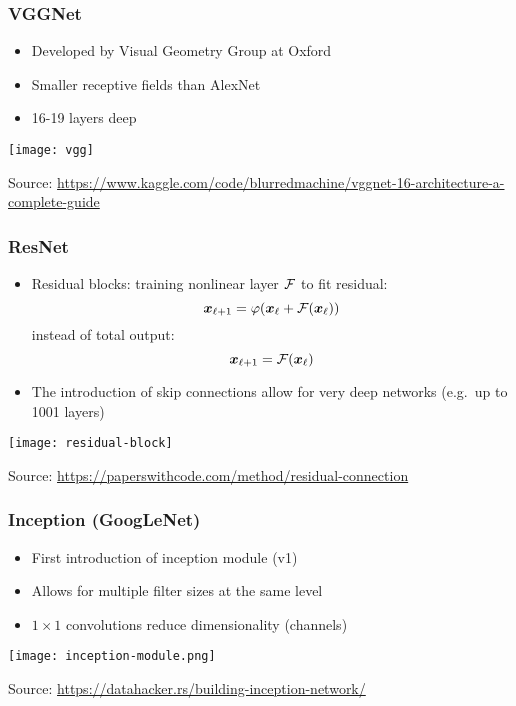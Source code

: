 \documentclass[smaller]{beamer}
\begin{document}
\begin{frame}
  \frametitle{VGGNet}
  \pe
  \begin{itemize}[<+->]
  \item Developed by Visual Geometry Group at Oxford
  \item Smaller receptive fields than AlexNet
  \item 16-19 layers deep
  \end{itemize}
  \pe
  \begin{center}
    \texttt{[image: vgg]}

    {\tiny Source: \url{https://www.kaggle.com/code/blurredmachine/vggnet-16-architecture-a-complete-guide}}
  \end{center}
\end{frame}

\begin{frame}
  \frametitle{ResNet}
  \pe
  \begin{itemize}
  \item Residual blocks: training nonlinear layer $\mathcal{F}$ to fit residual:\pe
    \begin{equation}
      \bm x_{\ell + 1} = \varphi(\bm x_{\ell} + \mathcal{F} (\bm x_{\ell}))
    \end{equation}\pe
    instead of total output:\pe
    \begin{equation}
      \bm x_{\ell + 1} = \mathcal{F} (\bm x_{\ell})
    \end{equation}
    \pe
  \item The introduction of skip connections allow for very deep networks (e.g.\ up to 1001 layers)
  \end{itemize}
  \pe
  \begin{center}
    \texttt{[image: residual-block]}

    {\tiny Source: \url{https://paperswithcode.com/method/residual-connection}}
  \end{center}
\end{frame}

\begin{frame}
  \frametitle{Inception (GoogLeNet)}
  \pe
  \begin{itemize}[<+->]
  \item First introduction of inception module (v1)
  \item Allows for multiple filter sizes at the same level
  \item $1\times 1$ convolutions reduce dimensionality (channels)
  \end{itemize}
  \pe
  \begin{center}
    \texttt{[image: inception-module.png]}

    {\tiny Source: \url{https://datahacker.rs/building-inception-network/}}
  \end{center}
\end{frame}
\end{document}
